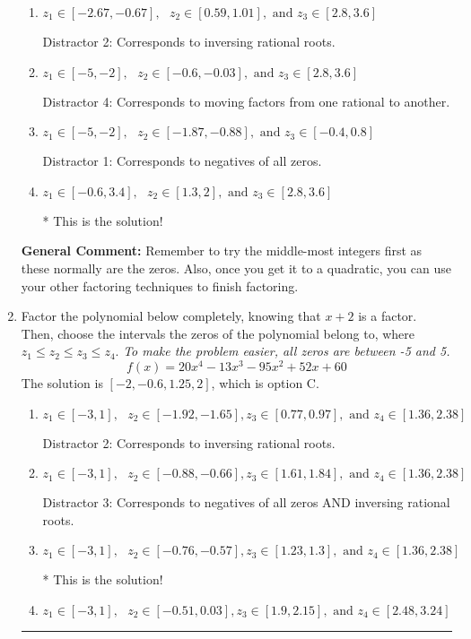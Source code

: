 \documentclass{extbook}[14pt]
\newcommand{\litem}[1]{\item #1

\rule{\textwidth}{0.4pt}}
\begin{document}
\begin{enumerate}
{\begin{enumerate}[label=\Alph*.]
 Distractor 3: Corresponds to negatives of all zeros AND inversing rational roots.
\item \( z_1 \in [-2.67, -0.67], \text{   }  z_2 \in [0.59, 1.01], \text{   and   } z_3 \in [2.8, 3.6] \)

 Distractor 2: Corresponds to inversing rational roots.
\item \( z_1 \in [-5, -2], \text{   }  z_2 \in [-0.6, -0.03], \text{   and   } z_3 \in [2.8, 3.6] \)

 Distractor 4: Corresponds to moving factors from one rational to another.
\item \( z_1 \in [-5, -2], \text{   }  z_2 \in [-1.87, -0.88], \text{   and   } z_3 \in [-0.4, 0.8] \)

 Distractor 1: Corresponds to negatives of all zeros.
\item \( z_1 \in [-0.6, 3.4], \text{   }  z_2 \in [1.3, 2], \text{   and   } z_3 \in [2.8, 3.6] \)

* This is the solution!
\end{enumerate}

\textbf{General Comment:} Remember to try the middle-most integers first as these normally are the zeros. Also, once you get it to a quadratic, you can use your other factoring techniques to finish factoring.
}
\litem{
Factor the polynomial below completely, knowing that $x+2$ is a factor. Then, choose the intervals the zeros of the polynomial belong to, where $z_1 \leq z_2 \leq z_3 \leq z_4$. \textit{To make the problem easier, all zeros are between -5 and 5.}
\[ f(x) = 20x^{4} -13 x^{3} -95 x^{2} +52 x + 60 \]The solution is \( [-2, -0.6, 1.25, 2] \), which is option C.\begin{enumerate}[label=\Alph*.]
\item \( z_1 \in [-3, 1], \text{   }  z_2 \in [-1.92, -1.65], z_3 \in [0.77, 0.97], \text{   and   } z_4 \in [1.36, 2.38] \)

 Distractor 2: Corresponds to inversing rational roots.
\item \( z_1 \in [-3, 1], \text{   }  z_2 \in [-0.88, -0.66], z_3 \in [1.61, 1.84], \text{   and   } z_4 \in [1.36, 2.38] \)

 Distractor 3: Corresponds to negatives of all zeros AND inversing rational roots.
\item \( z_1 \in [-3, 1], \text{   }  z_2 \in [-0.76, -0.57], z_3 \in [1.23, 1.3], \text{   and   } z_4 \in [1.36, 2.38] \)

* This is the solution!
\item \( z_1 \in [-3, 1], \text{   }  z_2 \in [-0.51, 0.03], z_3 \in [1.9, 2.15], \text{   and   } z_4 \in [2.48, 3.24] \)


\end{enumerate}}
\end{enumerate}
\end{document}
